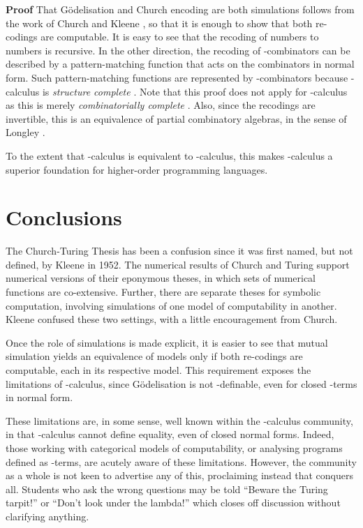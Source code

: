 \documentclass[a4paper]{article}
\newenvironment{proof}
	{\par\noindent\upshape\textbf{Proof}\quad}
	{\hspace*{\fill}}
\begin{document}
\begin{proof}
  That G\"odelisation and Church encoding are both simulations follows
  from the work of Church \cite{Church36} and Kleene \cite{Kleene36},
  so that it is enough to show that both re-codings are computable. It
  is easy to see that the recoding of numbers to numbers is recursive.
  In the other direction, the recoding of -combinators can be
  described by a pattern-matching function that acts on the
  combinators in normal form.  Such pattern-matching functions are
  represented by -combinators because -calculus is {\em
    structure complete} \cite{JGW11}. Note that this proof does not
  apply for -calculus as this is merely {\em combinatorially
    complete} \cite{TRS}. Also, since the recodings are invertible,
  this is an equivalence of partial combinatory algebras, in the sense
  of Longley \cite{Longley14}.
\end{proof}

To the extent that -calculus is equivalent to -calculus, this
makes -calculus a superior foundation for higher-order programming
languages.



\section{Conclusions}
\label{sec:conclusions}

The Church-Turing Thesis has been a confusion since it was first
named, but not defined, by Kleene in 1952.  The numerical results of
Church and Turing support numerical versions of their eponymous theses, in which
sets of numerical functions are co-extensive. Further, there are
separate theses for symbolic computation, involving simulations of one
model of computability in another. Kleene confused these two
settings, with a little encouragement from Church.  

Once the role of simulations is made explicit, it is easier to see
that mutual simulation yields an equivalence of models only if both
re-codings are computable, each in its respective model. This
requirement exposes the limitations of -calculus, since
G\"odelisation is not -definable, even for closed -terms in
normal form.

These limitations are, in some sense, well known within the
-calculus community, in that -calculus cannot define equality,
even of closed normal forms. Indeed, those working with categorical
models of computability, or analysing programs defined as -terms,
are acutely aware of these limitations. However, the community as a
whole is not keen to advertise any of this, proclaiming instead that
 conquers all. Students who ask the wrong questions may be told
``Beware the Turing tarpit!''  \cite{Perlis82} or ``Don't look under
the lambda!''  which closes off discussion without clarifying anything.
\end{document}
